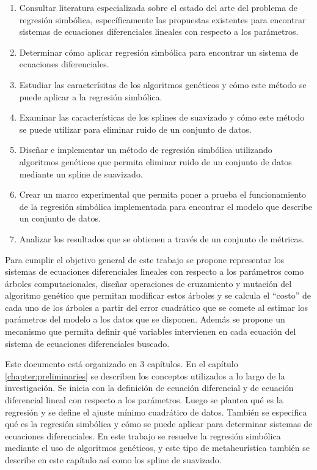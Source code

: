 \begin{enumerate}
    \item Consultar literatura especializada sobre el estado del arte del problema de regresión simbólica, específicamente las propuestas existentes para encontrar sistemas de ecuaciones diferenciales lineales con respecto a los parámetros.
    \item Determinar cómo aplicar regresión simbólica para encontrar un sistema de ecuaciones diferenciales.
    \item Estudiar las caracterísitas de los algoritmos genéticos y cómo este método se puede aplicar a la regresión simbólica.
    \item Examinar las características de los splines de suavizado y cómo este método se puede utilizar para eliminar ruido de un conjunto de datos.
    \item Diseñar e implementar un método de regresión simbólica utilizando algoritmos genéticos que permita eliminar ruido de un conjunto de datos mediante un spline de suavizado.
    \item Crear un marco experimental que permita poner a prueba el funcionamiento de la regresión simbólica implementada para encontrar el modelo que describe un conjunto de datos.
    \item Analizar los resultados que se obtienen a través de un conjunto de métricas.
\end{enumerate}

Para cumplir el objetivo general de este trabajo se propone representar los sistemas de ecuaciones diferenciales lineales con respecto a los parámetros como árboles computacionales, diseñar operaciones de cruzamiento y mutación del algoritmo genético que permitan modificar estos árboles y se calcula el ``costo'' de cada uno de los árboles a partir del error cuadrático que se comete al estimar los parámetros del modelo a los datos que se disponen. Además se propone un mecanismo que permita definir qué variables intervienen en cada ecuación del sistema de ecuaciones diferenciales buscado.

Este documento está organizado en 3 capítulos. En el capítulo \ref{chapter:preliminaries} se describen los conceptos utilizados a lo largo de la investigación. Se inicia con la definición de ecuación diferencial y de ecuación diferencial lineal con respecto a los parámetros. Luego se plantea qué es la regresión y se define el ajuste mínimo cuadrático de datos. También se especifica qué es la regresión simbólica y cómo se puede aplicar para determinar sistemas de ecuaciones diferenciales. En este trabajo se resuelve la regresión simbólica mediante el uso de algoritmos genéticos, y este tipo de metaheurística también se describe en este capítulo así como los spline de suavizado.

